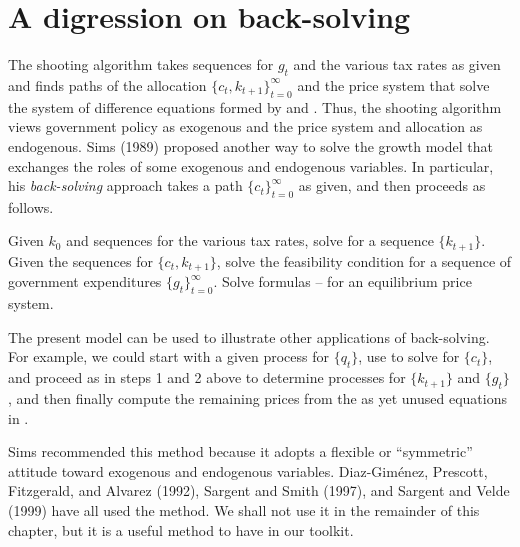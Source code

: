 \section{A digression on back-solving}\label{sec:back-solving}%
The shooting algorithm takes sequences  for $g_t$  and the various
tax rates as  given and finds paths of the allocation $\{c_t,
k_{t+1}\}_{t=0}^\infty$ and the price system that solve the system
of difference equations formed by  and .
Thus, the shooting algorithm
views government policy as exogenous and the price system
and allocation as endogenous.   Sims (1989) proposed another
way to solve  the growth model that exchanges the roles of
some  exogenous and endogenous variables. In particular,
his
  {\it back-solving\/} approach  takes a path  $\{c_t\}_{t=0}^\infty$
  as given, and
then proceeds as follows. 

\medskip
{} Given $k_0$ and sequences for the various
tax rates, solve  for a sequence $\{k_{t+1}\}$.
\medskip
{} Given the sequences for $\{c_t, k_{t+1}\}$,
solve the feasibility condition 
for a sequence of government expenditures $\{g_t\}_{t=0}^\infty$.
\medskip
{} Solve formulas --
for an equilibrium price system.
\medskip

The present model can be used to illustrate other applications of
back-solving. For example, we could start with a given
 process for
$\{q_t\}$,  use  to solve for $\{c_t\}$, and
proceed as in steps 1 and 2 above to determine processes for
$\{k_{t+1}\}$ and $\{g_t\}$, and then finally  compute the
remaining prices from the as yet unused equations in
. 

  Sims recommended this method because it adopts a flexible or
``symmetric'' attitude toward exogenous and endogenous variables.
Diaz-Gim\' enez,  Prescott, Fitzgerald, and
 Alvarez (1992), Sargent and Smith (1997), and Sargent and Velde
(1999) have all used the method. We shall not use it in the
remainder of this chapter, but it is a useful method to have in
our toolkit.    

